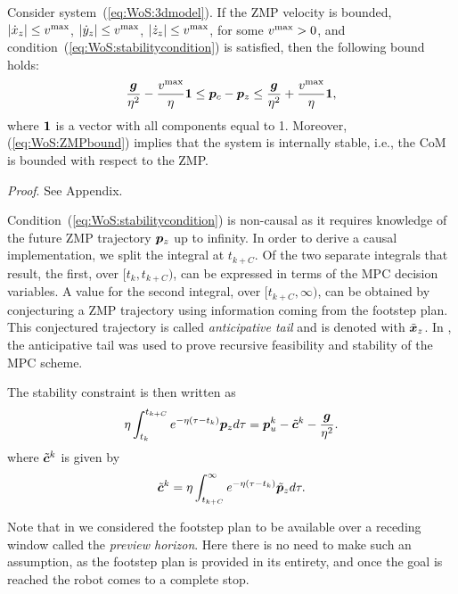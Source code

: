 \medskip

\begin{proposition}
Consider system~(\ref{eq:WoS:3dmodel}). If the ZMP velocity is bounded, 
$|\dot x_z|\le v^{\rm max}$, $|\dot y_z|\le v^{\rm max}$, $|\dot z_z|\le v^{\rm max}$, for some $v^{\rm max}>0$, and condition~(\ref{eq:WoS:stabilitycondition}) is satisfied, then the following bound holds:
\begin{equation}
\label{eq:WoS:ZMPbound}
\frac{{\bm{g}}}{\eta^2}- \frac{v^{\rm max}}{\eta}{\bf 1} \le {\bm{p}}_c-{\bm{p}}_z \le \frac{{\bm{g}}}{\eta^2}+\frac{v^{\rm max}}{\eta}{\bf 1},
\end{equation}
where ${\bf 1}$ is a vector with all components equal to 1. Moreover, (\ref{eq:WoS:ZMPbound}) implies that the system is internally stable, i.e., the CoM is bounded with respect to the ZMP.
\label{prop:velocityBound}
\end{proposition}

\medskip

\emph{Proof}. See Appendix.

\medskip

Condition~(\ref{eq:WoS:stabilitycondition}) is non-causal as it requires knowledge of the future ZMP trajectory ${\bm{p}}_z$ up to infinity. In order to derive a causal implementation, we split the integral at $t_{k+C}$. Of the two separate integrals that result, the first, over $[t_k, t_{k+C})$, can be expressed in terms of the MPC decision variables. A value for the second integral, over $[t_{k+C}, \infty)$, can be obtained by conjecturing a ZMP trajectory using information coming from the footstep plan.
This conjectured trajectory is called \emph{anticipative tail} and is denoted with $\tilde {{\bm{x}}}_z$. 
In \cite{ScDeLaOr:20}, the anticipative tail was used to prove recursive feasibility and stability of the MPC scheme.

The stability constraint is then written as
\begin{equation}\label{eq:WoS:stability_constraint}
\eta\int_{t_k}^{t_{k+C}}e^{-\eta(\tau - t_k)}{\bm{p}}_z d\tau = {\bm{p}}_u^k - \tilde {{\bm{c}}}^k - \frac{{\bm{g}}}{\eta^2}.
\end{equation}
where $\tilde {{\bm{c}}}^k$ is given by
\begin{equation}%
\tilde\bfc^k = \eta\int_{t_{k+C}}^{\infty}e^{-\eta(\tau - t_k)}\tilde\bfp_z d\tau.
\end{equation}

Note that in \cite{ScDeLaOr:20} we considered the footstep plan to be available over a receding window called the \emph{preview horizon}. Here there is no need to make such an assumption, as the footstep plan is provided in its entirety, and once the goal is reached the robot comes to a complete stop.

